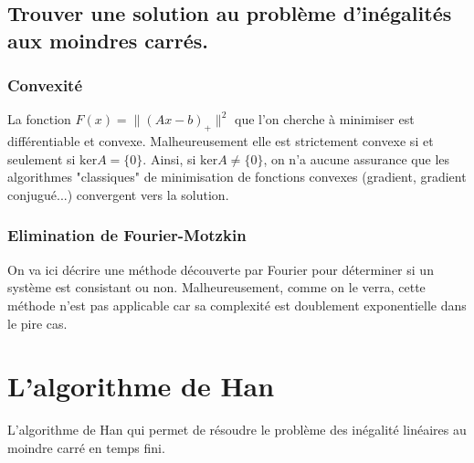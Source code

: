 \documentclass[10pt,a4paper]{article}
\begin{document}
\subsection{Trouver une solution au problème d'inégalités aux moindres carrés.}

\subsubsection{Convexité}
La fonction $F(x)=\|(Ax-b)_+ \|^2$ que l'on cherche à minimiser est différentiable et convexe.
Malheureusement elle est strictement convexe si et seulement si $\text{ker}A=\lbrace 0\rbrace$.
Ainsi, si $\text{ker}A \neq \lbrace 0\rbrace$, on n'a aucune assurance que les algorithmes "classiques" de minimisation de fonctions convexes (gradient, gradient conjugué...) convergent vers la solution.

\subsubsection{Elimination de Fourier-Motzkin}
On va ici décrire une méthode découverte par Fourier pour déterminer si un système est consistant ou non.
Malheureusement, comme on le verra, cette méthode n'est pas applicable car sa complexité est doublement exponentielle dans le pire cas.


\section{L'algorithme de Han}

L'algorithme de Han \cite{hanalgo} qui permet de résoudre le problème des inégalité linéaires au moindre carré en temps fini.
\end{document}
